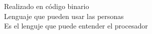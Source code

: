 \documentclass[preview]{standalone}
\begin{document}
Realizado en código binario\\Lenguaje que pueden usar las personas\\Es el lenguje que puede entender el procesador\\
\end{document}

